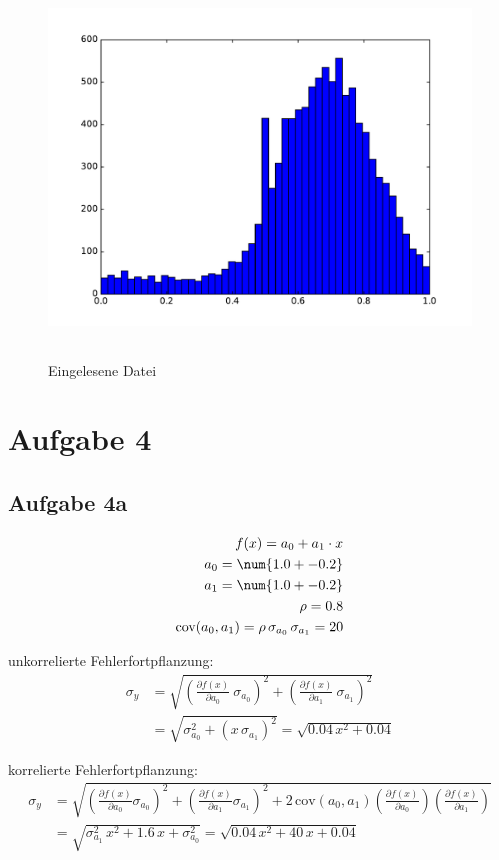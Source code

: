 \begin{figure}
  \centering
  \includegraphics[height=10cm]{Python/aufg3e.pdf}
  \caption{Eingelesene Datei}
\end{figure}
\section*{Aufgabe 4}
\subsection*{Aufgabe 4a}
\begin{align*}
  f(x) = a_0 + a_1 \cdot x \\
  a_0 = \num{1.0 +- 0.2} \\
  a_1 = \num{1.0 +- 0.2} \\
  \rho = 0.8 \\
  \text{cov}(a_0, a_1) = \rho\,\sigma_{a_0}\,\sigma_{a_1} = 20
\end{align*}

unkorrelierte Fehlerfortpflanzung:
\begin{align*}
  \sigma_y &= \sqrt{\left(\frac{\partial f(x)}{\partial a_0}\ \sigma_{a_0} \right)^2 + \left(\frac{\partial f(x)}{\partial a_1}\ \sigma_{a_1} \right)^2} \\
  &= \sqrt{\sigma_{a_0}^2 + (x\,\sigma_{a_1})^2} = \sqrt{0.04\,x^2 + 0.04}
\end{align*}

korrelierte Fehlerfortpflanzung:
\begin{align*}
  \sigma_y &= \sqrt{\left(\frac{\partial f(x)}{\partial a_0} \sigma_{a_0} \right)^2 + \left(\frac{\partial f(x)}{\partial a_1} \sigma_{a_1} \right)^2 + 2\, \text{cov}(a_0, a_1) \left(\frac{\partial f(x)}{\partial a_0}\right) \left(\frac{\partial f(x)}{\partial a_1}\right)} \\
  &= \sqrt{\sigma_{a_1}^2\,x^2 + 1.6\,x + \sigma_{a_0}^2} = \sqrt{0.04\,x^2 + 40\,x + 0.04}
\end{align*}
